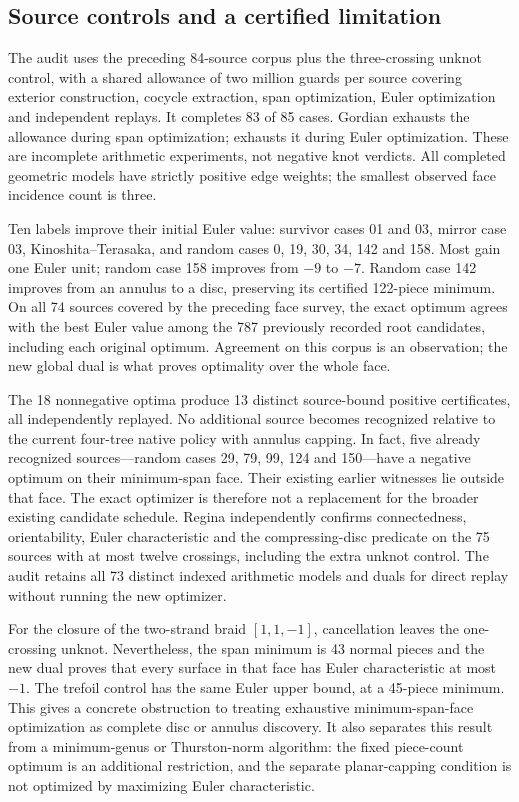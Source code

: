 \subsection{Source controls and a certified limitation}

The audit uses the preceding 84-source corpus plus the three-crossing unknot
control, with a shared allowance of two million guards per source covering
exterior construction, cocycle extraction, span optimization, Euler
optimization and independent replays. It completes 83 of 85 cases. Gordian
exhausts the allowance during span optimization;  exhausts it
during Euler optimization. These are incomplete arithmetic experiments, not
negative knot verdicts. All completed geometric models have strictly positive
edge weights; the smallest observed face incidence count is three.

Ten labels improve their initial Euler value: survivor cases 01 and 03,
mirror case 03, Kinoshita--Terasaka, and random cases 0, 19, 30, 34, 142 and 158.
Most gain one Euler unit; random case 158 improves from $-9$ to $-7$.
Random case 142 improves from an annulus to a disc, preserving its certified
122-piece minimum. On all 74 sources covered by the preceding face survey,
the exact optimum agrees with the best Euler value among the 787 previously
recorded root candidates, including each original optimum. Agreement on this
corpus is an observation; the new global dual is what proves optimality over
the whole face.

The 18 nonnegative optima produce 13 distinct source-bound positive
certificates, all independently replayed. No additional source becomes
recognized relative to the current four-tree native policy with annulus
capping. In fact, five already recognized sources---random cases 29, 79, 99,
124 and 150---have a negative optimum on their minimum-span face. Their
existing earlier witnesses lie outside that face. The exact optimizer is
therefore not a replacement for the broader existing candidate schedule.
Regina independently confirms connectedness, orientability, Euler
characteristic and the compressing-disc predicate on the 75 sources with at
most twelve crossings, including the extra unknot control. The audit retains
all 73 distinct indexed arithmetic models and duals for direct replay without
running the new optimizer.

For the closure of the two-strand braid $[1,1,-1]$, cancellation leaves the
one-crossing unknot. Nevertheless, the span minimum is 43 normal pieces and
the new dual proves that every surface in that face has Euler characteristic
at most $-1$. The trefoil control has the same Euler upper bound, at a
45-piece minimum. This gives a concrete obstruction to treating exhaustive
minimum-span-face optimization as complete disc or annulus discovery. It
also separates this result from a minimum-genus or Thurston-norm algorithm:
the fixed piece-count optimum is an additional restriction, and the separate
planar-capping condition is not optimized by maximizing Euler characteristic.

